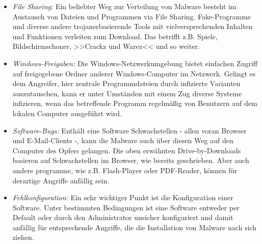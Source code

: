 \begin{itemize}
	\item \textit{File Sharing:} Ein beliebter Weg zur Verteilung von Malware besteht im Austausch von Dateien und Programmen via File Sharing. Fake-Programme und diverse andere trojanerbasierende Tools mit vielversprechenden Inhalten und Funktionen verleiten zum Download. Das betrifft z.B. Spiele, Bildschirmschoner, >>Crackz und Warez<< und so weiter.
	\item \textit{Windows-Freigaben:} Die Windows-Netzwerkumgebung bietet einfachen Zugriff auf freigegebene Ordner anderer Windows-Computer im Netzwerk. Gelingt es dem Angreifer, hier zentrale Programmdateien durch infizierte Varianten auszutauschen, kann er unter Umständen mit einem Zug diverse Systeme infizieren, wenn das betreffende Programm regelmäßig von Benutzern auf dem lokalen Computer ausgeführt wird.
	\item \textit{Software-Bugs:} Enthält eine Software Schwachstellen - allen voran Browser und E-Mail-Clients -, kann die Malware auch über diesen Weg auf den Computer des Opfers gelangen. Die oben erwähnten Drive-by-Downloads basieren auf Schwachstellen im Browser, wie bereits geschrieben. Aber auch andere programme, wie z.B. Flash-Player oder PDF-Reader, können für derartige Angriffe anfällig sein.
	\item \textit{Fehlkonfiguration:} Ein sehr wichtiger Punkt ist die Konfiguration einer Software. Unter bestimmten Bedingungen ist eine Software entweder per Default oder durch den Administrator unsicher konfiguriert und damit anfällig für entsprechende Angriffe, die die Installation von Malware nach sich ziehen.
\end{itemize}

